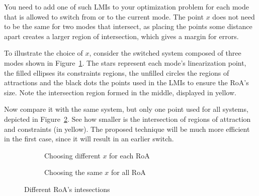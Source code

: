 You need to add one of such LMIs to your optimization problem for each mode that
is allowed to switch from or to the current mode. The point \(x\) does not need
to be the same for two modes that intersect, as placing the points some distance
apart creates a larger region of intersection, which gives a margin for errors.

To illustrate the choice of \(x\), consider the switched system composed of
three modes shown in Figure~\ref{fig:choice-x-roa-diff}. The stars represent
each mode's linearization point, the filled ellipses its constraints regions,
the unfilled circles the regions of attractions and the black dots the points
used in the LMIs to ensure the RoA's size. Note the intersection region formed
in the middle, displayed in yellow.

Now compare it with the same system, but only one point used for all systems,
depicted in Figure~\ref{fig:choice-x-roa-same}. See how smaller is the
intersection of regions of attraction and constraints (in yellow). The proposed
technique will be much more efficient in the first case, since it will result in
an earlier switch.

\begin{figure}[!htb]
  \centering
  \begin{subfigure}[b]{.45\linewidth}
    \centering
    
    \caption{Choosing different \(x\) for each RoA}%
    \label{fig:choice-x-roa-diff}
  \end{subfigure}
  \begin{subfigure}[b]{.45\linewidth}
    \centering
    
    \caption{Choosing the same \(x\) for all RoA}%
    \label{fig:choice-x-roa-same}
  \end{subfigure}
  \caption{Different RoA's intesections}%
  \label{fig:choices-of-x}
\end{figure}

